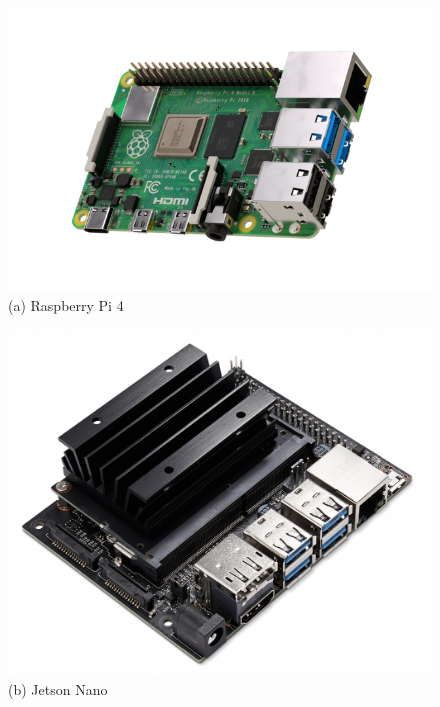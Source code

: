 \begin{figure} [H]
	\centering
    \begin{minipage}{.5\textwidth}
      \centering
      \includegraphics[width=\linewidth]{../Images/Design-Implementation/raspberry-pi-4.png}\\
      {(a) Raspberry Pi 4 }
    \end{minipage}%
    \begin{minipage}{.5\textwidth}
      \centering
      \includegraphics[width=.9\linewidth]{../Images/Design-Implementation/jetson-nano.jpeg}\\
      {(b) Jetson Nano }
	\end{minipage}
    \hfill \break
    \decoRule
    \label{fig:embedded-linux-systems}
\end{figure}

